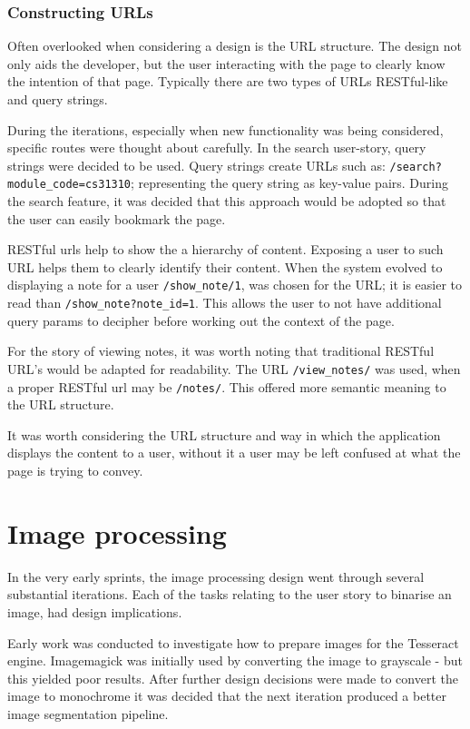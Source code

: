 \subsubsection{Constructing URLs}
Often overlooked when considering a design is the URL structure. The design not only aids the developer, but the user interacting with the page to clearly know the intention of that page. Typically there are two types of URLs RESTful-like and query strings.

During the iterations, especially when new functionality was being considered, specific routes were thought about carefully. In the search user-story, query strings were decided to be used. Query strings create URLs such as: \texttt{/search?module\_code=cs31310}; representing the query string as key-value pairs. During the search feature, it was decided that this approach would be adopted so that the user can easily bookmark the page.

RESTful urls help to show the a hierarchy of content. Exposing a user to such URL helps them to clearly identify their content. When the system evolved to displaying a note for a user \texttt{/show\_note/1}, was chosen for the URL; it is easier to read than  \texttt{/show\_note?note\_id=1}. This allows the user to not have additional query params to decipher before working out the context of the page.

For the story of viewing notes, it was worth noting that traditional RESTful URL's would be adapted for readability. The URL \texttt{/view\_notes/} was used, when a proper RESTful url may be \texttt{/notes/}. This offered more semantic meaning to the URL structure.

It was worth considering the URL structure and way in which the application displays the content to a user, without it a user may be left confused at what the page is trying to convey.

\section{Image processing}
In the very early sprints, the image processing design went through several substantial iterations. Each of the tasks relating to the user story to binarise an image, had design implications.

Early work was conducted to investigate how to prepare images for the Tesseract engine. Imagemagick \cite{citeulike:14023816} was initially used by converting the image to grayscale - but this yielded poor results. After further design decisions were made to convert the image to monochrome it was decided that the next iteration produced a better image segmentation pipeline.

